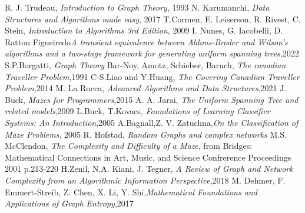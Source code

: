 
\begin{thebibliography}{100}

R. J. Trudeau, \emph{Introduction to Graph Theory}, 1993
N. Karumanchi, \emph{Data Structures and Algorithms made easy}, 2017
T.Cormen, E. Leiserson, R. Rivest, C. Stein, \emph{Introduction to Algorithms 3rd Edition}, 2009
I. Nunes, G. Iacobelli, D. Ratton Figueiredo\emph{A transient equivalence between Aldous-Broder and Wilson's algorithms and a two-stage framework for generating uniform spanning trees},2022
S.P.Borgatti, \emph{Graph Theory}
Bar-Noy, Amotz, Schieber, Baruch, \emph{The canadian Traveller Problem},1991
C-S.Liao and Y.Huang, \emph{The Covering Canadian Traveller Problem},2014
M. La Rocca, \emph{Advanced Algorithms and Data Structures},2021 
J. Buck, \emph{Mazes for Programmers},2015
A. A. Jarai, \emph{The Uniform Spanning Tree and related models},2009
L.Buck, T.Kovacs, \emph{Foundations of Learning Classifier Systems: An Introduction},2005
A.Bagnall,Z. V. Zatuchna,\emph{On the Classification of Maze Problems}, 2005
R. Hofstad, \emph{Random Graphs and complex networks}
M.S. McClendon, \emph{The Complexity and Difficulty of a Maze}, from Bridges: Mathematical Connections in Art, Music, and Science Confrerence Proceedings 2001 p.213-220
H.Zenil, N.A. Kiani, J. Tegner, \emph{A Review of Graph and Network Complexity from an Algorithmic Information Perspective},2018
M. Dehmer, F. Emmert-Streib, Z. Chen, X. Li, Y. Shi,\emph{Mathematical Foundations and Applications of Graph Entropy},2017

\end{thebibliography}
